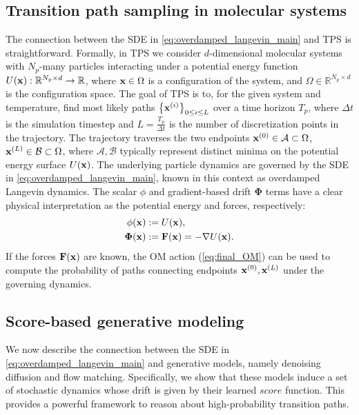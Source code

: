 \subsection{Transition path sampling in molecular systems} 
The connection between the SDE in \eqref{eq:overdamped_langevin_main} and TPS is straightforward. Formally, in TPS we consider $d$-dimensional molecular systems with $N_p$-many particles interacting under a potential energy function $U(\mathbf{\mathbf{x}}): \mathbb{R}^{N_p \times d} \rightarrow \mathbb{R}$, where $\mathbf{x} \in \Omega$ is a configuration of the system, and $\Omega \in  \mathbb{R}^{N_p \times d}$ is the configuration space. The goal of TPS is to, for the given system and temperature, find most likely paths $\left\{\mathbf{x}^{(i)} \right\}_{0 \leq i \leq L}$ over a time horizon $T_p$, where $\Delta t$ is the simulation timestep and $L = \frac{T_p}{\Delta t}$ is the number of discretization points in the trajectory. The trajectory traverses the two endpoints $\mathbf{x}^{(0)} \in \mathcal{A} \subset \Omega$, $\mathbf{x}^{(L)} \in \mathcal{B} \subset \Omega$, where $\mathcal{A}, \mathcal{B}$ typically represent distinct minima on the potential energy surface $U(\mathbf{x})$. The underlying particle dynamics are governed by the SDE in \eqref{eq:overdamped_langevin_main}, known in this context as overdamped Langevin dynamics. The scalar $\phi$ and gradient-based drift $\mathbf{\Phi}$ terms have a clear physical interpretation as the potential energy and forces, respectively:
\vspace{-5pt}
\begin{align}
    \phi(\mathbf{x}) &:= U(\mathbf{x}), \\
    \mathbf{\Phi}(\mathbf{x}) &:= \mathbf{F}(\mathbf{x}) = -\nabla U(\mathbf{x}).
\end{align}
If the forces $\mathbf{F}(\mathbf{x})$ are known, the OM action (\eqref{eq:final_OM}) can be used to compute the probability of paths connecting endpoints $\mathbf{x}^{(0)}, \mathbf{x}^{(L)}$ under the governing dynamics.

\vspace{-3pt}
\subsection{Score-based generative modeling}
We now describe the connection between the SDE in \eqref{eq:overdamped_langevin_main} and generative models, namely denoising diffusion and flow matching. Specifically, we show that these models induce a set of stochastic dynamics whose drift is given by their learned $\textit{score}$ function. This provides a powerful framework to reason about high-probability transition paths.
